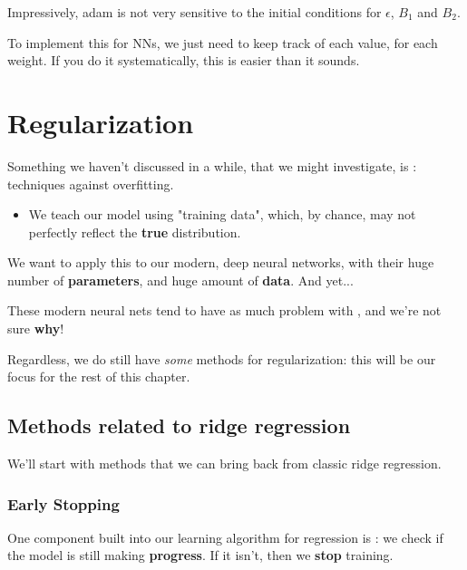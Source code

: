             Impressively, adam is not very sensitive to the initial conditions for $\epsilon$, $B_1$ and $B_2$.

            To implement this for NNs, we just need to keep track of each value, for each weight. If you do it systematically, this is easier than it sounds.
            




\pagebreak

\section{Regularization}

    Something we haven't discussed in a while, that we might investigate, is : techniques against overfitting.

    \begin{itemize}
        \item We teach our model using "training data", which, by chance, may not perfectly reflect the \textbf{true} distribution.
    \end{itemize}

    We want to apply this to our modern, deep neural networks, with their huge number of \textbf{parameters}, and huge amount of \textbf{data}. And yet...
    
    These modern neural nets  tend to have as much problem with , and we're not sure \textbf{why}!

    Regardless, we do still have \textit{some} methods for regularization: this will be our focus for the rest of this chapter.

    \subsection{Methods related to ridge regression}

        We'll start with methods that we can bring back from classic ridge regression.

        \subsubsection{Early Stopping}

            One component built into our learning algorithm for regression is : we check if the model is still making \textbf{progress}. If it isn't, then we \textbf{stop} training.

